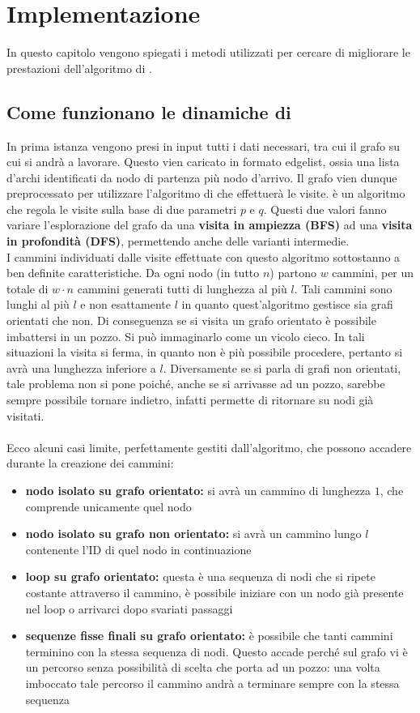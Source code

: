 %
%
%
\chapter{Implementazione}\label{chap:1}
In questo capitolo vengono spiegati i metodi utilizzati per cercare di migliorare le prestazioni dell'algoritmo di \cnrl \cite{CNRL_code}.
%
\section{Come funzionano le dinamiche di \cnrl}
In prima istanza vengono presi in input tutti i dati necessari, tra cui il grafo su cui si andrà a lavorare. Questo vien caricato in formato edgelist, ossia una lista d'archi identificati da nodo di partenza più nodo d'arrivo. Il grafo vien dunque preprocessato per utilizzare l'algoritmo di \textbf{\nv} che effettuerà le visite. \nv è un algoritmo che regola le visite sulla base di due parametri $p$ e $q$. Questi due valori fanno variare l'esplorazione del grafo da una \textbf{visita in ampiezza (BFS)} ad una \textbf{visita in profondità (DFS)}, permettendo anche delle varianti intermedie.\\
I cammini individuati dalle visite effettuate con questo algoritmo sottostanno a ben definite caratteristiche. Da ogni nodo (in tutto $n$) partono $w$ cammini, per un totale di $w \cdot n$ cammini generati tutti di lunghezza al più $l$. Tali cammini sono lunghi al più  $l$ e non esattamente $l$ in quanto quest'algoritmo gestisce sia grafi orientati che non. Di conseguenza se si visita un grafo orientato è possibile imbattersi in un pozzo. Si può immaginarlo come un vicolo cieco. In tali situazioni la visita si ferma, in quanto non è più possibile procedere, pertanto si avrà una lunghezza inferiore a $l$. Diversamente se si parla di grafi non orientati, tale problema non si pone poiché, anche se si arrivasse ad un pozzo, sarebbe sempre possibile tornare indietro, infatti \nv permette di ritornare su nodi già visitati.\\
\\
Ecco alcuni casi limite, perfettamente gestiti dall'algoritmo, che possono accadere durante la creazione dei cammini:
\begin{itemize}
	\item \textbf{nodo isolato su grafo orientato:} si avrà un cammino di lunghezza $1$, che comprende unicamente quel nodo
	\item \textbf{nodo isolato su grafo non orientato:} si avrà un cammino lungo $l$ contenente l'ID di quel nodo in continuazione
	\item \textbf{loop su grafo orientato:} questa è una sequenza di nodi che si ripete costante attraverso il cammino, è possibile iniziare con un nodo già presente nel loop o arrivarci dopo svariati passaggi
	\item \textbf{sequenze fisse finali su grafo orientato:} è possibile che tanti cammini terminino con la stessa sequenza di nodi. Questo accade perché sul grafo vi è un percorso senza possibilità di scelta che porta ad un pozzo: una volta imboccato tale percorso il cammino andrà a terminare sempre con la stessa sequenza
\end{itemize}
